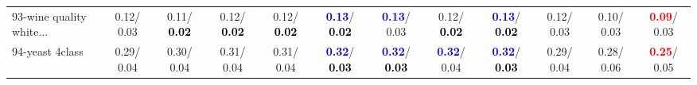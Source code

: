 \begin{table}[h]
\begin{center}
{\begin{tabular}{lc|c|c|c|c|c|c|c|c|c|c}
93-wine quality white... &   0.12/  0.03 &   0.11/\textcolor{black}{\textbf{  0.02}} &   0.12/\textcolor{black}{\textbf{  0.02}} &   0.12/\textcolor{black}{\textbf{  0.02}} & \textcolor{blue}{\textbf{  0.13}}/\textcolor{black}{\textbf{  0.02}} & \textcolor{blue}{\textbf{  0.13}}/  0.03 &   0.12/\textcolor{black}{\textbf{  0.02}} & \textcolor{blue}{\textbf{  0.13}}/\textcolor{black}{\textbf{  0.02}} &   0.12/  0.03 &   0.10/  0.03 & \textcolor{red}{\textbf{  0.09}}/  0.03 \\
94-yeast 4class &   0.29/  0.04 &   0.30/  0.04 &   0.31/  0.04 &   0.31/  0.04 & \textcolor{blue}{\textbf{  0.32}}/\textcolor{black}{\textbf{  0.03}} & \textcolor{blue}{\textbf{  0.32}}/\textcolor{black}{\textbf{  0.03}} & \textcolor{blue}{\textbf{  0.32}}/  0.04 & \textcolor{blue}{\textbf{  0.32}}/\textcolor{black}{\textbf{  0.03}} &   0.29/  0.04 &   0.28/  0.06 & \textcolor{red}{\textbf{  0.25}}/  0.05 \\\end{tabular}}\label{stratsALCKappa2a5NNRedux}
\end{center}
\end{table}
